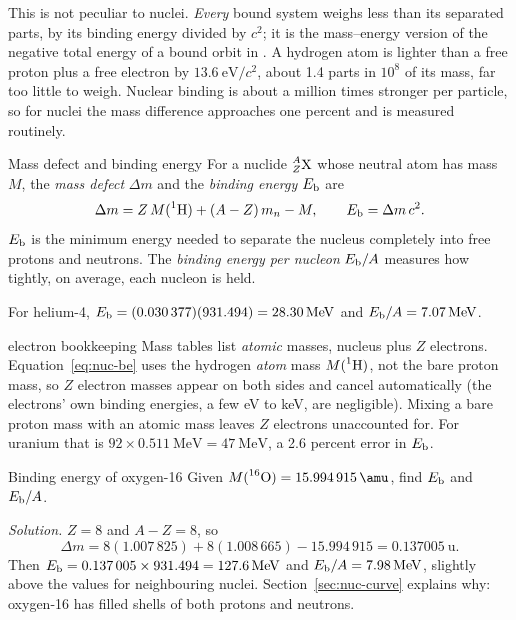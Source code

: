 This is not peculiar to nuclei. \emph{Every} bound system weighs less than its separated parts, by its
binding energy divided by $c^2$; it is the mass--energy version of the negative total energy of a bound
orbit in . A hydrogen atom is lighter than a free proton plus a free electron by
$\SI{13.6}{\electronvolt}/c^2$, about 1.4 parts in $10^{8}$ of its mass, far too little to weigh. Nuclear
binding is about a million times stronger per particle, so for nuclei the mass difference approaches one
percent and is measured routinely.

\begin{defbox}{Mass defect and binding energy}
For a nuclide $\prescript{A}{Z}{\mathrm{X}}$ whose neutral atom has mass $M$, the \emph{mass defect} $\Delta m$ and the
\emph{binding energy} $E_{\mathrm{b}}$ are
\begin{equation}\label{eq:nuc-be}
\Delta m = Z\,M(\prescript{1}{}{\mathrm{H}})+(A-Z)\,m_n - M,\qquad E_{\mathrm{b}}=\Delta m\,c^2.
\end{equation}
$E_{\mathrm{b}}$ is the minimum energy needed to separate the nucleus completely into free protons and neutrons.
The \emph{binding energy per nucleon} $E_{\mathrm{b}}/A$ measures how tightly, on average, each nucleon is held.
\end{defbox}

For helium-4, $\Eb=(0.030\,377)(931.494)=\SI{28.30}{\MeV}$ and $\Eb/A=\SI{7.07}{\MeV}$.

\begin{trapbox}{electron bookkeeping}
Mass tables list \emph{atomic} masses, nucleus plus $Z$ electrons. Equation~\eqref{eq:nuc-be} uses the
hydrogen \emph{atom} mass $M(\prescript{1}{}{\mathrm{H}})$, not the bare proton mass, so $Z$ electron masses appear on both
sides and cancel automatically (the electrons' own binding energies, a few \si{\electronvolt} to
\si{\keV}, are negligible). Mixing a bare proton mass with an atomic mass leaves $Z$ electrons unaccounted
for. For uranium that is $92\times\SI{0.511}{\MeV}=\SI{47}{\MeV}$, a \num{2.6} percent error in $E_{\mathrm{b}}$.
\end{trapbox}

\begin{exbox}{Binding energy of oxygen-16}\label{ex:nuc-o16}
Given $M(\iso{16}{O})=\SI{15.994915}{\amu}$, find $E_{\mathrm{b}}$ and $E_{\mathrm{b}}/A$.

\emph{Solution.} $Z=8$ and $A-Z=8$, so
\[
\Delta m=8(1.007\,825)+8(1.008\,665)-15.994\,915=\SI{0.137005}{\amu}.
\]
Then $\Eb=0.137\,005\times931.494=\SI{127.6}{\MeV}$ and $\Eb/A=\SI{7.98}{\MeV}$, slightly above the
values for neighbouring nuclei. Section~\ref{sec:nuc-curve} explains why: oxygen-16 has filled shells
of both protons and neutrons.
\end{exbox}

